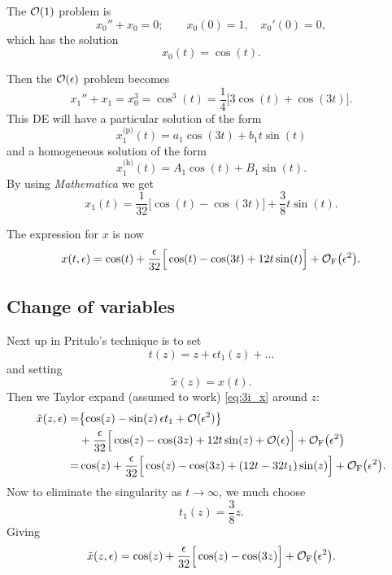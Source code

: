 \documentclass[11pt,letter, swedish, english
]{article}
\begin{document}
The $\order{1}$ problem is 
\begin{equation}
x_0''+x_0=0;\qquad
x_0(0)=1,\quad {x_0'}(0)=0,
\end{equation}
which has the solution
\begin{equation}
x_0(t)=\cos(t).
\end{equation}

Then the $\order{\epsilon}$ problem becomes
\begin{equation}
x_1''+x_1=x_0^3=\cos^3(t)=\frac{1}{4}
\Big[3\cos(t)+\cos(3t)\Big].
\end{equation}
This DE will have a particular solution of the form
\begin{equation}
x_1^\text{(p)}(t)=a_1\cos(3t)+b_1t\sin(t)
\end{equation}
and a homogeneous solution of the form
\begin{equation}
x_1^\text{(h)}(t)=A_1\cos(t)+B_1\sin(t).
\end{equation}
By using \textit{Mathematica} we get
\begin{equation}
x_1(t)=\frac{1}{32}\Big[\cos(t)-\cos(3t) \Big] + \frac{3}{8}t\sin(t).
\end{equation}

The expression for $x$ is now
\begin{equation}\label{eq:3i_x}
x(t,\epsilon)=\cos(t)+
\frac{\epsilon}{32}\Big[\cos(t)-\cos(3t)+ 12t\sin(t) \Big]
+\mathcal{O}_\text{F}\qty(\epsilon^2).
\end{equation}

\subsection{Change of variables}
Next up in Pritulo's technique is to set
\begin{equation}
t(z)=z+\epsilon t_1(z)+\ldots
\end{equation}
and setting
\begin{equation}
\tilde{x}(z)=x(t).
\end{equation}
Then we Taylor expand (assumed to work) \eqref{eq:3i_x} around $z$:
\begin{equation}
\begin{aligned}
\tilde{x}(z,\epsilon)=&\qty{\cos(z)-\sin(z)\,\epsilon t_1
+\order*{\epsilon^2}}\\
&+\frac{\epsilon}{32}\Big[\cos(z)-\cos(3z)+ 12t\sin(z)
+\order*{\epsilon} \Big]
+\mathcal{O}_\text{F}\qty(\epsilon^2)\\
=&\cos(z)
+\frac{\epsilon}{32}\Big[\cos(z)-\cos(3z)+ (12t-32t_1)\sin(z)
\Big]
+\mathcal{O}_\text{F}\qty(\epsilon^2).
\end{aligned}
\end{equation}
Now to eliminate the singularity as $t\to\infty$, we much choose
\begin{equation}
t_1(z)=\frac{3}{8}z.
\end{equation}
Giving
\begin{equation}
\tilde{x}(z,\epsilon)=\cos(z)
+\frac{\epsilon}{32}\Big[\cos(z)-\cos(3z)\Big]
+\mathcal{O}_\text{F}\qty(\epsilon^2).
\end{equation}
\end{document}
